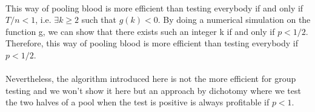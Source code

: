 \paragraph{}
This way of pooling blood is more efficient than testing everybody if and only if $T/n<1$, i.e. $\exists k \geqslant 2$ such that $g(k)<0$. 
By doing a numerical simulation on the function g, we can show that there exists such an integer k if and only if $p<1/2$. Therefore, this way of pooling blood is more efficient than testing everybody if $p<1/2$.


\paragraph{}
Nevertheless, the algorithm introduced here is not the more efficient for group testing and we won't show it here but an approach by dichotomy where we test the two halves of a pool when the test is positive is always profitable if $p<1$.